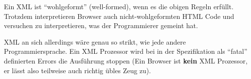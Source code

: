 Ein XML ist "`wohlgeformt"' (well-formed), wenn es die obigen Regeln erfüllt. Trotzdem interpretieren Browser auch nicht-wohlgeformten HTML Code und versuchen zu interpretieren, was der Programmierer gemeint hat.

XML an sich allerdings wäre genau so strikt, wie jede andere Programmiersprache. Ein XML Prozessor wird bei in der Spezifikation als "`fatal"' definierten Errors die Ausführung stoppen (Ein Browser ist \textbf{kein} XML Prozessor, er lässt also teilweise auch richtig übles Zeug zu).